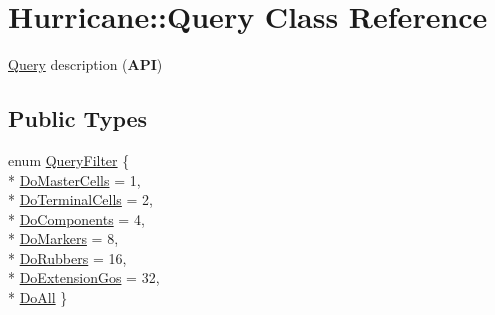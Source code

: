 \hypertarget{classHurricane_1_1Query}{\section{Hurricane\-:\-:Query Class Reference}
\label{classHurricane_1_1Query}
}


\hyperlink{classHurricane_1_1Query}{Query} description ({\bfseries A\-P\-I})  


\subsection*{Public Types}
\begin{DoxyCompactItemize}
\item 
enum \hyperlink{classHurricane_1_1Query_a003517b82eaba58104d1749cf344eaa9}{Query\-Filter} \{ \\*
\hyperlink{classHurricane_1_1Query_a003517b82eaba58104d1749cf344eaa9a427b951cfef3fbeb3c2baa9abc4eae83}{Do\-Master\-Cells} = 1, 
\\*
\hyperlink{classHurricane_1_1Query_a003517b82eaba58104d1749cf344eaa9a2a1f9d4cf126b86694e05152a1b04ee9}{Do\-Terminal\-Cells} = 2, 
\\*
\hyperlink{classHurricane_1_1Query_a003517b82eaba58104d1749cf344eaa9a7b591d72b86f94f90d212746ed8f9f56}{Do\-Components} = 4, 
\\*
\hyperlink{classHurricane_1_1Query_a003517b82eaba58104d1749cf344eaa9ade01b12e4a2af3bfba0440caa557619a}{Do\-Markers} = 8, 
\\*
\hyperlink{classHurricane_1_1Query_a003517b82eaba58104d1749cf344eaa9a3671f7b32f05ccbd1db6e6e94da040e4}{Do\-Rubbers} = 16, 
\\*
\hyperlink{classHurricane_1_1Query_a003517b82eaba58104d1749cf344eaa9a241d98f4f53e908f113669540ef4288c}{Do\-Extension\-Gos} = 32, 
\\*
\hyperlink{classHurricane_1_1Query_a003517b82eaba58104d1749cf344eaa9ad3d1832e33bbdd8fa1e07ce622c984ec}{Do\-All}
 \}
\end{DoxyCompactItemize}
